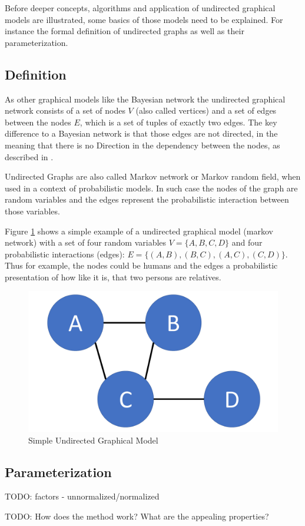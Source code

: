 Before deeper concepts, algorithms and application of undirected graphical models are illustrated, some basics of those models need to be explained. For instance the formal definition of undirected graphs as well as their parameterization.

\subsection{Definition}

As other graphical models like the Bayesian network the undirected graphical network consists of a set of nodes $V$ (also called vertices) and a set of edges between the nodes $E$, which is a set of tuples of exactly two edges. The key difference to a Bayesian network is that those edges are not directed, in the meaning that there is no Direction in the dependency between the nodes, as described in \cite{koller2009probabilistic}.

Undirected Graphs are also called Markov network or Markov random field, when used in a context of probabilistic models. In such case the nodes of the graph are random variables and the edges represent the probabilistic interaction between those variables.

Figure \ref{fig:basic} shows a simple example of a undirected graphical model (markov network) with a set of four random variables $V=\{A,B,C,D\}$ and four probabilistic interactions (edges): $E=\{(A,B),(B,C),(A,C),(C,D)\}$. Thus for example, the nodes could be humans and the edges a probabilistic presentation of how like it is, that two persons are relatives.

\begin{figure}[htpb]
  \centering
  	\includegraphics[scale=0.3]{img/basic.pdf} 
  \caption{Simple Undirected Graphical Model}
  \label{fig:basic}
\end{figure}

\subsection{Parameterization}

TODO: factors - unnormalized/normalized


TODO: How does the method work? What are the appealing properties?